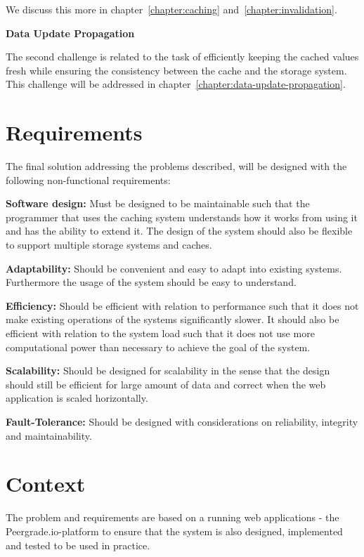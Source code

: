 We discuss this more in chapter~\ref{chapter:caching} and~\ref{chapter:invalidation}.

\textbf{Data Update Propagation}

The second challenge is related to the task of efficiently keeping the cached values fresh while ensuring the consistency between the cache and the storage system. This challenge will be addressed in chapter~\ref{chapter:data-update-propagation}.


\section{Requirements}
\label{sec:requirements}

The final solution addressing the problems described, will be designed with the following non-functional requirements:

\textbf{Software design:} Must be designed to be maintainable such that the programmer that uses the caching system understands how it works from using it and has the ability to extend it. The design of the system should also be flexible to support multiple storage systems and caches.

\textbf{Adaptability:} Should be convenient and easy to adapt into existing systems. Furthermore the usage of the system should be easy to understand.

\textbf{Efficiency:} Should be efficient with relation to performance such that it does not make existing operations of the systems significantly slower. It should also be efficient with relation to the system load such that it does not use more computational power than necessary to achieve the goal of the system.

\textbf{Scalability:} Should be designed for scalability in the sense that the design should still be efficient for large amount of data and correct when the web application is scaled horizontally.

\textbf{Fault-Tolerance:} Should be designed with considerations on reliability, integrity and maintainability.


\section{Context}
\label{sec:context}

The problem and requirements are based on a running web applications - the Peergrade.io-platform to ensure that the system is also designed, implemented and tested to be used in practice.

